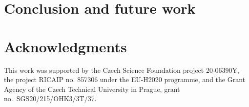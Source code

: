 \documentclass[runningheads]{llncs}
\begin{document}

\section{Conclusion and future work}
\label{sec:conclusion}


\section*{Acknowledgments}



This work was supported by
the Czech Science Foundation project 20-06390Y,
the project RICAIP no. 857306 under the EU-H2020 programme,
and
the Grant Agency of the Czech Technical University in Prague, grant\\
no.~SGS20/215/OHK3/3T/37.





%
\end{document}
